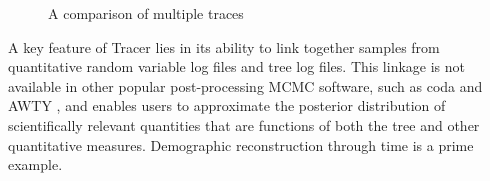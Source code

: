 \documentclass{bioinfo}
\begin{document}
%
\begin{figure}[ht]
\caption{A comparison of multiple traces}
\label{fig:multitrace}
\end{figure}
%


A key feature of Tracer lies in its ability to link together samples from quantitative random variable log files and tree log files.
This linkage is not available in other popular post-processing MCMC software, such as coda \citep{plummer2006coda} and AWTY \citep{nylander2007awty}, and enables users to approximate the posterior distribution of scientifically relevant quantities that are functions of both the tree and other quantitative measures.
Demographic reconstruction through time is a prime example.
\end{document}
